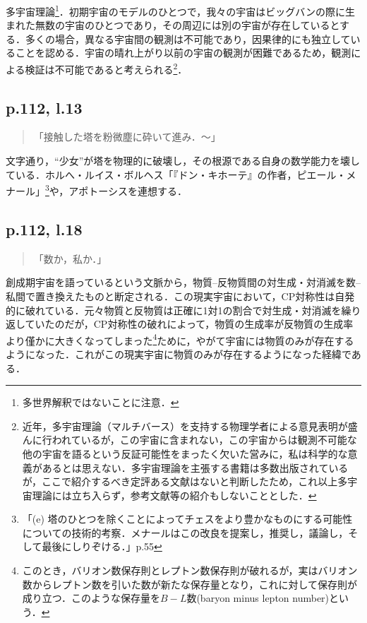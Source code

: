 \documentclass[10pt, a5paper, twoside]{jsarticle}
\theoremstyle{definition}
\begin{document}
			多宇宙理論\footnote{多世界解釈ではないことに注意．}．初期宇宙のモデルのひとつで，我々の宇宙はビッグバンの際に生まれた無数の宇宙のひとつであり，その周辺には別の宇宙が存在しているとする．多くの場合，異なる宇宙間の観測は不可能であり，因果律的にも独立していることを認める．宇宙の晴れ上がり以前の宇宙の観測が困難であるため，観測による検証は不可能であると考えられる\footnote{近年，多宇宙理論（マルチバース）を支持する物理学者による意見表明が盛んに行われているが，この宇宙に含まれない，この宇宙からは観測不可能な他の宇宙を語るという反証可能性をまったく欠いた営みに，私は科学的な意義があるとは思えない．多宇宙理論を主張する書籍は多数出版されているが，ここで紹介するべき定評ある文献はないと判断したため，これ以上多宇宙理論には立ち入らず，参考文献等の紹介もしないこととした．}．

		\subsection{p.112, l.13}

			\begin{quote}

				「接触した塔を粉微塵に砕いて進み．〜」
				
			\end{quote}

			文字通り，“少女”が塔を物理的に破壊し，その根源である自身の数学能力を壊している．ホルへ・ルイス・ボルヘス「『ドン・キホーテ』の作者，ピエール・メナール」\footnote{「(e) 塔のひとつを除くことによってチェスをより豊かなものにする可能性についての技術的考察．メナールはこの改良を提案し，推奨し，議論し，そして最後にしりぞける．」\cite{jorge}p.55}や，アポトーシスを連想する．

		\subsection{p.112, l.18}

			\begin{quote}

				「数か，私か．」
				
			\end{quote}

			創成期宇宙を語っているという文脈から，物質--反物質間の対生成・対消滅を数--私間で置き換えたものと断定される．この現実宇宙において，CP対称性は自発的に破れている．元々物質と反物質は正確に1対1の割合で対生成・対消滅を繰り返していたのだが，CP対称性の破れによって，物質の生成率が反物質の生成率より僅かに大きくなってしまった\footnote{このとき，バリオン数保存則とレプトン数保存則が破れるが，実はバリオン数からレプトン数を引いた数が新たな保存量となり，これに対して保存則が成り立つ．このような保存量を$B - L$数(baryon minus lepton number)という．}ために，やがて宇宙には物質のみが存在するようになった．これがこの現実宇宙に物質のみが存在するようになった経緯である．
\end{document}
